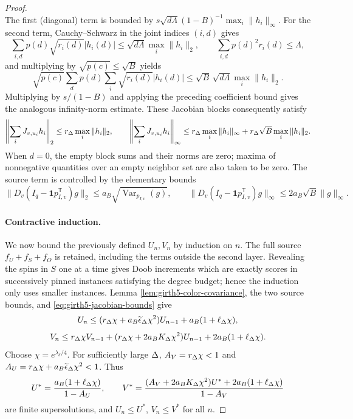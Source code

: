 \begin{proof}
\[\]
The first (diagonal) term is bounded by
$s\sqrt{d\Lambda}(1-B)^{-1}\max_i\|h_i\|_\infty$.
For the second term, Cauchy--Schwarz in the joint indices $(i,d)$ gives
\[
 \sum_{i,d}p(d)\sqrt{r_i(d)}|h_i(d)|
 \le \sqrt{d\Lambda}\max_i\|h_i\|_2,
 \qquad \sum_{i,d}p(d)^2r_i(d)\le\Lambda,
\]
and multiplying by $\sqrt{p(c)}\le\sqrt B$ yields
\[
 \sqrt{p(c)}\sum_d p(d)\sum_i\sqrt{r_i(d)}|h_i(d)|
 \le\sqrt B\,\sqrt{d\Lambda}\max_i\|h_i\|_2.
\]
Multiplying by $s/(1-B)$ and applying the preceding coefficient bound
gives the analogous infinity-norm estimate.  These Jacobian blocks consequently satisfy
\begin{equation}\label{eq:girth5-jacobian-bounds}
 \left\|\sum_iJ_{v,u_i}h_i\right\|_2
 \le r_\Delta\max_i\|h_i\|_2,\qquad
 \left\|\sum_iJ_{v,u_i}h_i\right\|_\infty
 \le r_\Delta\max_i\|h_i\|_\infty
 +r_\Delta\sqrt B\max_i\|h_i\|_2.
\end{equation}
When $d=0$, the empty block sums and their norms are zero; maxima of
nonnegative quantities over an empty neighbor set are also taken to be
zero.  The source term is controlled by the elementary bounds
\begin{equation}\label{eq:girth5-source-bounds}
 \|D_v(I_q-\mathbf1p_{I,v}^{\mathsf T})g\|_2
 \le a_B\sqrt{\operatorname{Var}_{p_{I,v}}(g)},
 \qquad
 \|D_v(I_q-\mathbf1p_{I,v}^{\mathsf T})g\|_\infty
 \le 2a_B\sqrt B\|g\|_\infty.
\end{equation}
\paragraph{Contractive induction.}
We now bound the previously defined $U_n,V_n$ by induction on $n$.
The full source $f_U+f_S+f_O$ is retained, including the terms outside
the second layer.  Revealing the spins in $S$ one at a time gives
Doob increments which are exactly scores in successively pinned instances
satisfying the degree budget; hence the induction only uses smaller instances.  Lemma
\ref{lem:girth5-color-covariance}, the two source bounds, and \eqref{eq:girth5-jacobian-bounds} give
\begin{equation}\label{eq:girth5-U-recursion}
 U_n\le (r_\Delta\chi+a_B\widetilde\epsilon_\Delta\chi^2)U_{n-1}
       +a_B(1+\ell_\Delta\chi),
\end{equation}
\begin{equation}\label{eq:girth5-V-recursion}
 V_n\le r_\Delta\chi V_{n-1}
 +(r_\Delta\chi+2a_BK_\Delta\chi^2)U_{n-1}
 +2a_B(1+\ell_\Delta\chi).
\end{equation}
Choose $\chi=e^{\lambda_\delta/4}$.  For sufficiently large $\Delta$,
$A_V=r_\Delta\chi<1$ and
$A_U=r_\Delta\chi+a_B\widetilde\epsilon_\Delta\chi^2<1$.  Thus
\begin{equation}\label{eq:girth5-supersolutions}
 U^*=\frac{a_B(1+\ell_\Delta\chi)}{1-A_U},\qquad
 V^*=\frac{(A_V+2a_BK_\Delta\chi^2)U^*
 +2a_B(1+\ell_\Delta\chi)}{1-A_V}
\end{equation}
are finite supersolutions, and $U_n\le U^*$, $V_n\le V^*$ for all $n$.


\end{proof}
